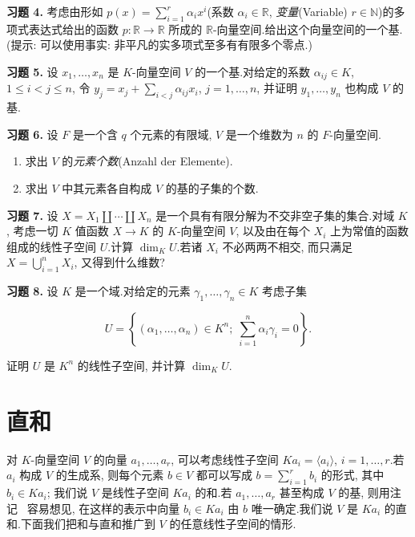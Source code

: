 \medskip
\noindent\textbf{习题 4.} 考虑由形如 $p(x) = \sum_{i = 1}^{r} \alpha_i x^i$(系数 $\alpha_i \in \mathbb{R}$, \emph{变量}(\textup{Variable}) $r \in \mathbb{N}$)的多项式表达式给出的函数 $p \colon \mathbb{R} \longrightarrow \mathbb{R}$ 所成的 $\mathbb{R}$-向量空间.给出这个向量空间的一个基.(提示: 可以使用事实: 非平凡的实多项式至多有有限多个零点.)

\medskip
\noindent\textbf{习题 5.} 设 $x_1, \ldots, x_n$ 是 $K$-向量空间 $V$ 的一个基.对给定的系数 $\alpha_{ij} \in K$, $1 \leq i < j \leq n$, 令 $y_j = x_j + \sum_{i < j} \alpha_{ij} x_i$, $j = 1, \ldots, n$, 并证明 $y_1, \ldots, y_n$ 也构成 $V$ 的基.

\medskip
\noindent\textbf{习题 6.} 设 $F$ 是一个含 $q$ 个元素的有限域, $V$ 是一个维数为 $n$ 的 $F$-向量空间.
\begin{enumerate}
\item[(i)] 求出 $V$ 的\emph{元素个数}(\textup{Anzahl der Elemente}).
\item[(ii)] 求出 $V$ 中其元素各自构成 $V$ 的基的子集的个数.
\end{enumerate}

\medskip
\noindent\textbf{习题 7.} 设 $X = X_1 \amalg \cdots \amalg X_n$ 是一个具有有限分解为不交非空子集的集合.对域 $K$, 考虑一切 $K$ 值函数 $X \longrightarrow K$ 的 $K$-向量空间 $V$, 以及由在每个 $X_i$ 上为常值的函数组成的线性子空间 $U$.计算 $\dim_K U$.若诸 $X_i$ 不必两两不相交, 而只满足 $X = \bigcup_{i = 1}^{n} X_i$, 又得到什么维数?

\medskip
\noindent\textbf{习题 8.} 设 $K$ 是一个域.对给定的元素 $\gamma_1, \ldots, \gamma_n \in K$ 考虑子集

\[
U = \left\{(\alpha_1, \ldots, \alpha_n) \in K^n;\; \sum_{i = 1}^{n} \alpha_i \gamma_i = 0\right\}\text{.}
\]

证明 $U$ 是 $K^n$ 的线性子空间, 并计算 $\dim_K U$.

\section{直和}\label{sec:1.6}

对 $K$-向量空间 $V$ 的向量 $a_1, \ldots, a_r$, 可以考虑线性子空间 $Ka_i = \langle a_i \rangle$, $i = 1, \ldots, r$.若 $a_i$ 构成 $V$ 的生成系, 则每个元素 $b \in V$ 都可以写成 $b = \sum_{i = 1}^{r} b_i$ 的形式, 其中 $b_i \in Ka_i$; 我们说 $V$ 是线性子空间 $Ka_i$ 的和.若 $a_1, \ldots, a_r$ 甚至构成 $V$ 的基, 则用注记~ 容易想见, 在这样的表示中向量 $b_i \in Ka_i$ 由 $b$ 唯一确定.我们说 $V$ 是 $Ka_i$ 的直和.下面我们把和与直和推广到 $V$ 的任意线性子空间的情形.

